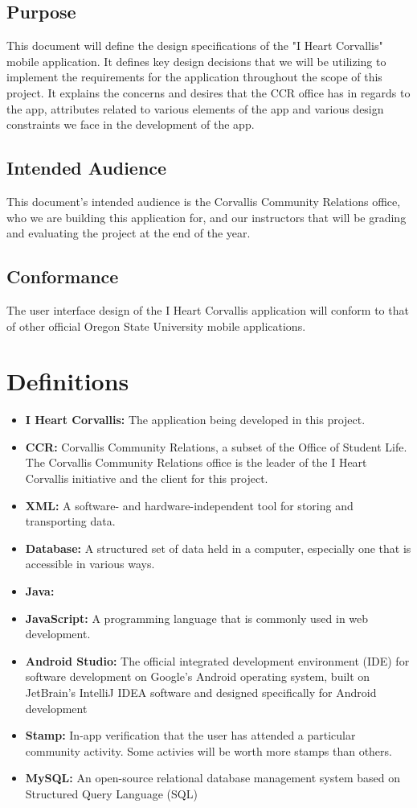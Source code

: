 \documentclass[draftclsnofoot, onecolumn, 10pt, compsoc]{IEEEtran}
\begin{document}
		\subsection{Purpose}
			This document will define the design specifications of the "I Heart Corvallis" mobile application. It defines key design decisions that we will be utilizing to implement the requirements for the application throughout the scope of this project. It explains the concerns and desires that the CCR office has in regards to the app, attributes related to various elements of the app and various design constraints we face in the development of the app.
		\subsection{Intended Audience}
			This document's intended audience is the Corvallis Community Relations office, who we are building this application for, and our instructors that will be grading and evaluating the project at the end of the year.
		\subsection{Conformance}
			The user interface design of the I Heart Corvallis application will conform to that of other official Oregon State University mobile applications.
		\newpage
		
	\section{Definitions}
		\begin{itemize}
			\item \textbf{I Heart Corvallis:} The application being developed in this project.
			\item \textbf{CCR:} Corvallis Community Relations, a subset of the Office of Student Life. The Corvallis Community Relations office is the leader of the I Heart Corvallis initiative and the client for this project.
			\item \textbf{XML:} A software- and hardware-independent tool for storing and transporting data.
			\item \textbf{Database:} A structured set of data held in a computer, especially one that is accessible in various ways.
			\item \textbf{Java:}
			\item \textbf{JavaScript:} A programming language that is commonly used in web development.
			\item \textbf{Android Studio:} The official integrated development environment (IDE) for software development on Google's Android operating system, built on JetBrain's IntelliJ IDEA software and designed specifically for Android development
			\item \textbf{Stamp:} In-app verification that the user has attended a particular community activity. Some activies will be worth more stamps than others.
			\item \textbf{MySQL:} An open-source relational database management system based on Structured Query Language (SQL)
		\end{itemize}
		
\end{document}
